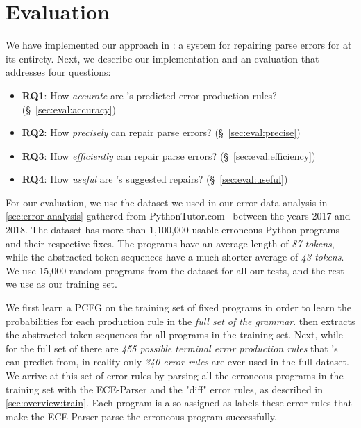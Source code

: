 \section{Evaluation}
\label{sec:eval}

We have implemented our approach in \toolname: a system for repairing parse
errors for \python at its entirety. Next, we describe our implementation and an
evaluation that addresses four questions:

\begin{itemize}
    \item \textbf{RQ1}: How \emph{accurate} are \toolname's predicted error production rules?
                        (\S~\ref{sec:eval:accuracy})
    \item \textbf{RQ2}: How \emph{precisely} can \toolname repair parse errors?
                        (\S~\ref{sec:eval:precise})
    \item \textbf{RQ3}: How \emph{efficiently} can \toolname repair parse errors?
                        (\S~\ref{sec:eval:efficiency})
    \item \textbf{RQ4}: How \emph{useful} are \toolname's suggested repairs?
                        (\S~\ref{sec:eval:useful})
\end{itemize}


For our evaluation, we use the \python dataset we used in our error data
analysis in \autoref{sec:error-analysis} gathered from
PythonTutor.com~\citep{Guo2013} between the years 2017 and 2018. The dataset has
more than 1,100,000 usable erroneous Python programs and their respective fixes.
The programs have an average length of \emph{87 tokens}, while the abstracted
token sequences have a much shorter average of \emph{43 tokens}. We use 15,000
random programs from the dataset for all our tests, and the rest we use as our
training set.

We first learn a PCFG on the training set of fixed programs in order to learn
the probabilities for each production rule in the \emph{full set of the \python
grammar}. \toolname then extracts the abstracted token sequences for all
programs in the training set. Next, while for the full set of \python there are
\emph{455 possible terminal error production rules} that \toolname's can predict
from, in reality only \emph{340 error rules} are ever used in the full dataset.
We arrive at this set of error rules by parsing all the erroneous programs in
the training set with the ECE-Parser and the "diff" error rules, as described in
\autoref{sec:overview:train}. Each program is also assigned as labels these
error rules that make the ECE-Parser parse the erroneous program successfully.

